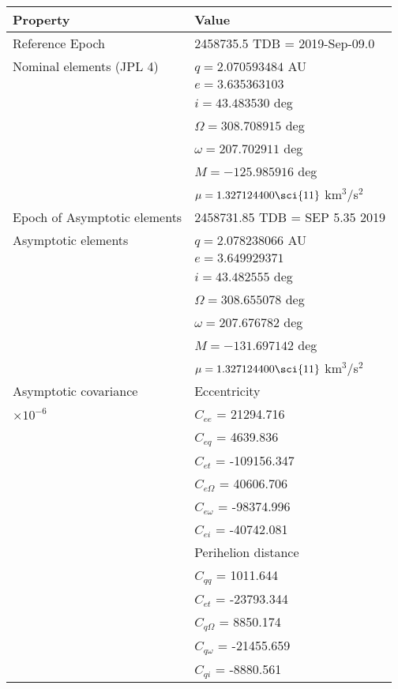 
\begin{table}
  \centering
  \scriptsize
  \begin{tabular}{ll}
  \hline Property & Value \\\hline\hline
  Reference Epoch & 2458735.5 TDB = 2019-Sep-09.0\\
  Nominal elements (JPL 4)   
                      & $q = 2.070593484$ AU \\
                      & $e = 3.635363103$ \\
                      & $i = 43.483530$ deg \\
                      & $\Omega = 308.708915$ deg \\
                      & $\omega = 207.702911$ deg \\
                      & $M = -125.985916$ deg \\
                      & $\mu = 1.327124400\sci{11}$ km$^3$/s$^2$\\
  Epoch of Asymptotic elements & 2458731.85 TDB = SEP 5.35 2019\\
  Asymptotic elements & $q = 2.078238066$ AU \\
                      & $e = 3.649929371$ \\
                      & $i = 43.482555$ deg \\
                      & $\Omega = 308.655078$ deg \\
                      & $\omega = 207.676782$ deg \\
                      & $M = -131.697142$ deg \\
                      & $\mu = 1.327124400\sci{11}$ km$^3$/s$^2$\\
  Asymptotic covariance 
                      & Eccentricity \\
  $\times 10^{-6}$   & $C_{ee}$ = 21294.716\\
                      & $C_{eq}$ = 4639.836\\
                      & $C_{et}$ = -109156.347\\
                      & $C_{e\Omega}$ = 40606.706\\
                      & $C_{e\omega}$ = -98374.996\\
                      & $C_{ei}$ = -40742.081\\

                      & Perihelion distance \\
                      & $C_{qq}$ = 1011.644\\
                      & $C_{et}$ = -23793.344\\
                      & $C_{q\Omega}$ = 8850.174\\
                      & $C_{q\omega}$ = -21455.659\\
                      & $C_{qi}$ = -8880.561\\


\end{tabular}
\end{table}
